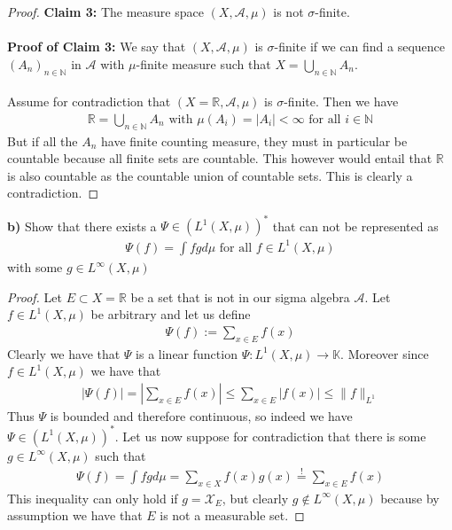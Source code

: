 \documentclass[12pt,a4paper]{article}
\begin{document}
\begin{proof}
\textbf{Claim 3:} The measure space $(X, \mathcal{A}, \mu)$ is not $\sigma$-finite. 
\\\\
\textbf{Proof of Claim 3:} We say that $(X, \mathcal{A},  \mu)$ is $\sigma$-finite if we can find a sequence $(A_n)_{n \in \mathbb{N}}$ in $\mathcal{A}$ with $\mu$-finite measure such that $X= \bigcup_{n \in \mathbb{N}} A_n$. 
\\\\
Assume for contradiction that $( X= \mathbb{R}, \mathcal{A}, \mu)$ is $\sigma$-finite. Then we have
\begin{align*}
\mathbb{R}= \bigcup_{n \in \mathbb{N}} A_n \text{ with } \mu(A_i)= |A_i| < \infty \text{ for all } i \in \mathbb{N}
\end{align*}
But if all the $A_n$ have finite counting measure, they must in particular be countable because all finite sets are countable. This however would entail that $\mathbb{R}$ is also countable as the countable union of countable sets. This is clearly a contradiction. 
\end{proof}
\newpage
\noindent \textbf{b)} Show that there exists a $\Psi \in (L^1(X, \mu))^*$ that can not be represented as \begin{align*}
\Psi(f) = \int fg d \mu \text{ for all } f \in L^1(X, \mu)
\end{align*}
with some $g \in L^\infty (X, \mu) $ 
\begin{proof}
Let $E \subset X= \mathbb{R}$ be a set that is not in our sigma algebra $\mathcal{A}$. Let $f \in L^1( X, \mu)$ be arbitrary and let us define
\begin{align*}
\Psi(f):= \sum_{x \in E} f(x) 
\end{align*}
Clearly we have that $\Psi$ is a linear function $\Psi: L^1(X, \mu) \to \mathbb{K}$. Moreover since $f \in L^1(X, \mu)$ we have that
\begin{align*}
|\Psi(f)| = \left | \sum_{x \in E} f(x) \right| \leq \sum_{x \in E} |f(x)|  \leq \|f\|_{L^1}
\end{align*}
Thus $\Psi$ is bounded and therefore continuous, so indeed we have $\Psi \in (L^1(X, \mu))^*$. Let us now suppose for contradiction that there is some $g \in L^\infty (X, \mu)$ such that \begin{align*}
\Psi(f) = \int fg d \mu = \sum_{x \in X} f(x)g(x) \overset{!}= \sum_{x \in E} f(x)
\end{align*}
This inequality can only hold if $g= \mathcal{X}_E$, but clearly $g \notin L^\infty(X, \mu)$ because by assumption we have that $E$ is not a measurable set. 
\end{proof}
\newpage
\end{document}
